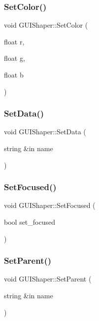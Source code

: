\subsubsection{\texorpdfstring{Set\+Color()}{SetColor()}}
{\footnotesize\ttfamily void G\+U\+I\+Shaper\+::\+Set\+Color (\begin{DoxyParamCaption}\item[{float}]{r,  }\item[{float}]{g,  }\item[{float}]{b }\end{DoxyParamCaption})}

\hypertarget{class_g_u_i_shaper_a862a1b159822d33d40b8d4511cd26216}{}\label{class_g_u_i_shaper_a862a1b159822d33d40b8d4511cd26216} 
\subsubsection{\texorpdfstring{Set\+Data()}{SetData()}}
{\footnotesize\ttfamily void G\+U\+I\+Shaper\+::\+Set\+Data (\begin{DoxyParamCaption}\item[{string \&in}]{name }\end{DoxyParamCaption})}

\hypertarget{class_g_u_i_shaper_aed37695cbd64f5f38ef000a151ce796c}{}\label{class_g_u_i_shaper_aed37695cbd64f5f38ef000a151ce796c} 
\subsubsection{\texorpdfstring{Set\+Focused()}{SetFocused()}}
{\footnotesize\ttfamily void G\+U\+I\+Shaper\+::\+Set\+Focused (\begin{DoxyParamCaption}\item[{bool}]{set\+\_\+focused }\end{DoxyParamCaption})}

\hypertarget{class_g_u_i_shaper_aa6f4827cc55f0f8a2ba546ae3a7817ea}{}\label{class_g_u_i_shaper_aa6f4827cc55f0f8a2ba546ae3a7817ea} 
\subsubsection{\texorpdfstring{Set\+Parent()}{SetParent()}}
{\footnotesize\ttfamily void G\+U\+I\+Shaper\+::\+Set\+Parent (\begin{DoxyParamCaption}\item[{string \&in}]{name }\end{DoxyParamCaption})}

